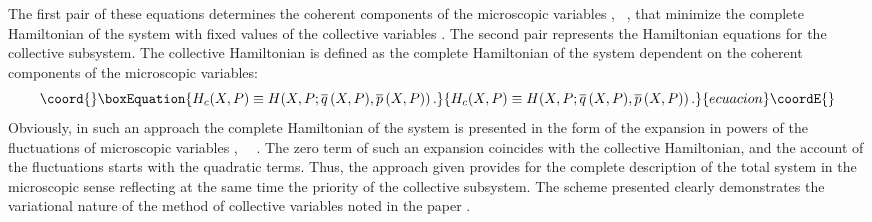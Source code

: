 \documentclass[a4paper,12pt]{article}
\begin{document}
The first pair of these equations determines the coherent components of the
microscopic variables \coordHE{}, \ \coordHE{}, that minimize the complete Hamiltonian of the
system with fixed values of the collective variables \coordHE{}. The second pair
represents the Hamiltonian equations for the collective subsystem. The
collective Hamiltonian \coordHE{} is defined as the complete Hamiltonian of
the system dependent on the coherent components of the microscopic variables:
\begin{equation*}\coord{}\boxEquation{
H_{c}(X,P)\equiv H(X,P;\overline{q}\,(X,P),\overline{p}\,(X,P))\,.
}{
H_{c}(X,P)\equiv H(X,P;\overline{q}\,(X,P),\overline{p}\,(X,P))\,.
}{ecuacion}\coordE{}\end{equation*}
Obviously, in such an approach the complete Hamiltonian of the
system is presented in the form of the expansion in powers of the
fluctuations of microscopic variables
\coordHE{}, \ \ \coordHE{}. The zero term of such an expansion
coincides with the collective Hamiltonian, and the account of the
fluctuations starts with the quadratic terms. Thus, the approach
given provides for the complete description of the total system in
the microscopic sense reflecting at the same time the priority of
the collective subsystem. The scheme presented clearly
demonstrates the variational nature of the method of collective
variables noted in the paper \cite{Ts1}.
\end{document}
